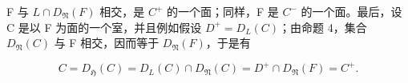 F 与 \(L \cap D_{\mathfrak{N}}(F)\) 相交，是 \(C^{+}\) 的一个面；同样，F 是 \(C^{-}\) 的一个面。最后，设 C 是以 F 为面的一个室，并且例如假设 \(D^{+} = D_{L}(C)\)；由命题 4，集合 \(D_{\mathfrak{N}}(C)\) 与 F 相交，因而等于 \(D_{\mathfrak{N}}(F)\)，于是有

\[
C = D _ {\mathfrak {H}} (C) = D _ {L} (C) \cap D _ {\mathfrak {N}} (C) = D ^ {+} \cap D _ {\mathfrak {N}} (F) = C ^ {+}.
\]

